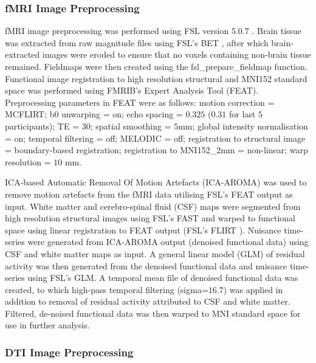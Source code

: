 \subsubsection{fMRI Image Preprocessing}
fMRI image preprocessing was performed using FSL version $5.0.7$ \citep{smith2004advances}. Brain tissue was extracted from raw magnitude files using FSL’s BET \citep{smith2002fast}, after which brain-extracted images were eroded to ensure that no voxels containing non-brain tissue remained. Fieldmaps were then created using the fsl\_prepare\_fieldmap function. Functional image registration to high resolution structural and MNI152 standard space was performed using FMRIB's Expert Analysis Tool (FEAT). Preprocessing parameters in FEAT were as follows: motion correction = MCFLIRT; b0 unwarping = on; echo spacing = $0.325$ ($0.31$ for last $5$ participants); TE = $30$; spatial smoothing = $5$mm; global intensity normalisation = on; temporal filtering = off; MELODIC = off; registration to structural image = boundary-based registration; registration to MNI152\_2mm = non-linear; warp resolution = $10$ mm. 

ICA-based Automatic Removal Of Motion Artefacts (ICA-AROMA) \citep{pruim2015ica} was used to remove motion artefacts from the fMRI data utilising FSL’s FEAT output as input. White matter and cerebro-spinal fluid (CSF) maps were segmented from high resolution structural images using FSL’s FAST \citep{zhang2001segmentation} and warped to functional space using linear registration to FEAT output (FSL’s FLIRT \citep{jenkinson2001global}). Nuisance time-series were generated from ICA-AROMA output (denoised functional data) using CSF and white matter maps as input. A general linear model (GLM) of residual activity was then generated from the denoised functional data and nuisance time-series using FSL’s GLM. A temporal mean file of denoised functional data was created, to which high-pass temporal filtering (sigma=$16.7$) was applied in addition to removal of residual activity attributed to CSF and white matter. Filtered, de-noised functional data was then warped to MNI standard space for use in further analysis.

\subsubsection{DTI Image Preprocessing}

